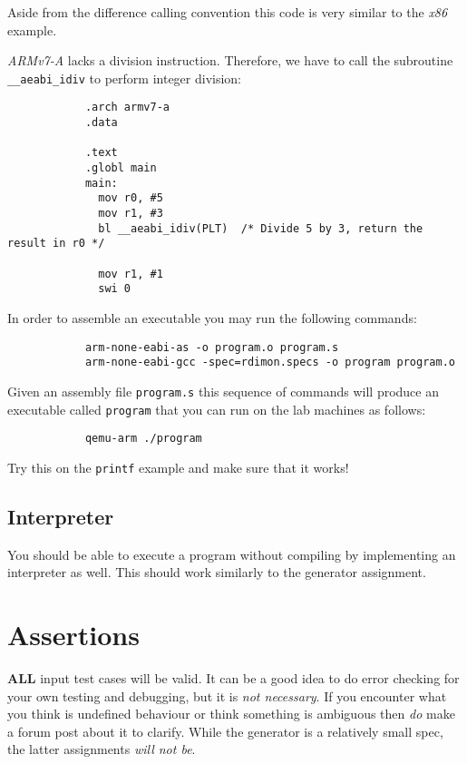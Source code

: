 \documentclass{article}
\begin{document}
		Aside from the difference calling convention this code is very similar to the \textit{x86} example.

		\textit{ARMv7-A} lacks a division instruction. Therefore, we have to call the subroutine
		\texttt{\_\_aeabi\_idiv} to perform integer division:

		\begin{lstlisting}
			.arch armv7-a
			.data

			.text
			.globl main
			main:
			  mov r0, #5
			  mov r1, #3
			  bl __aeabi_idiv(PLT)  /* Divide 5 by 3, return the result in r0 */

			  mov r1, #1
			  swi 0
		\end{lstlisting}

		In order to assemble an executable you may run the following commands:

		\begin{lstlisting}
			arm-none-eabi-as -o program.o program.s
			arm-none-eabi-gcc -spec=rdimon.specs -o program program.o
		\end{lstlisting}

		Given an assembly file \texttt{program.s} this sequence of commands will produce an executable called
		\texttt{program} that you can run on the lab machines as follows:

		\begin{lstlisting}
			qemu-arm ./program
		\end{lstlisting}

		Try this on the \texttt{printf} example and make sure that it works!


	\subsection{Interpreter}

		You should be able to execute a program without compiling by implementing an interpreter as well. This should
		work similarly to the generator assignment.

\section{Assertions}
\textbf{ALL} input test cases will be valid. It can be a good idea to do error checking for your
own testing and debugging, but it is \textit{not necessary}. If you encounter what you think is
undefined behaviour or think something is ambiguous then \textit{do} make a forum post about it to
clarify. While the generator is a relatively small spec, the latter assignments \textit{will not
be}.
\end{document}
